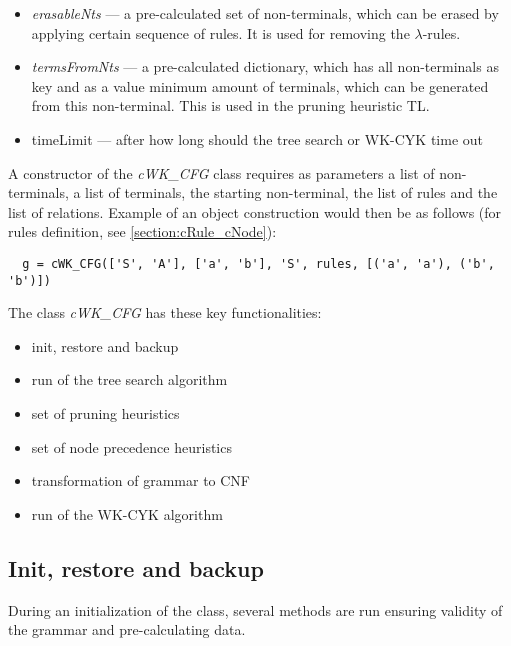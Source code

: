 \begin{itemize}
  \item{\textit{erasableNts} --- a pre-calculated set of non-terminals, which can be erased by applying certain sequence of rules. It is used for removing the $\lambda$-rules.}

  \item{\textit{termsFromNts} --- a pre-calculated dictionary, which has all non-terminals as key and as a value minimum amount of terminals, which can be generated from this non-terminal. This is used in the pruning heuristic TL.}

  \item{timeLimit --- after how long should the tree search or WK-CYK time out}
\end{itemize}

A constructor of the \textit{cWK\_CFG} class requires as parameters a list of non-terminals, a list of terminals, the starting non-terminal, the list of rules and the list of relations. Example of an object construction would then be as follows (for rules definition, see \ref{section:cRule_cNode}):
\begin{verbatim}
  g = cWK_CFG(['S', 'A'], ['a', 'b'], 'S', rules, [('a', 'a'), ('b', 'b')])
\end{verbatim}

\bigskip
The class \textit{cWK\_CFG} has these key functionalities:
\begin{itemize}
  \item{init, restore and backup}
  \item{run of the tree search algorithm}
  \item{set of pruning heuristics}
  \item{set of node precedence heuristics}
  \item{transformation of grammar to CNF}
  \item{run of the WK-CYK algorithm}
\end{itemize}

\subsection{Init, restore and backup}
During an initialization of the class, several methods are run ensuring validity of the grammar and pre-calculating data.

